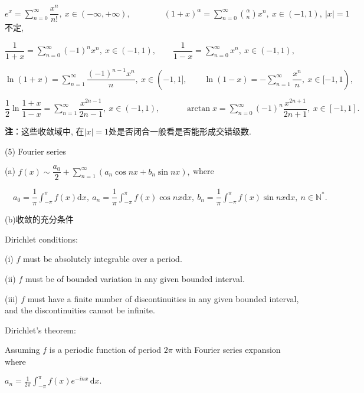 \documentclass[UTF8]{ctexart}
\newcommand\dif{\mathrm{d}}
\newcommand\no{\noindent}
\newcommand\dis{\displaystyle}
\newcommand\sumn{\dis\sum\limits_{n=1}^{\infty}}
\newcommand\sumnz{\dis\sum\limits_{n=0}^{\infty}}
\newcommand\intd{\dis\int}
\begin{document}
\begin{spacing}{2}
\vspace{0.2cm}

$e^x=\sumnz\dfrac{x^n}{n!},\ x\in(-\infty,+\infty),\qquad\qquad(1+x)^\alpha=\sumnz\binom{\alpha}{n}x^n,\ x\in(-1,1),\ |x|=1$不定,

\vspace{0.2cm}

$\dfrac{1}{1+x}=\sumnz(-1)^nx^n,\ x\in(-1,1),\qquad
\dfrac{1}{1-x}=\sumnz x^n,\ x\in(-1,1),$

\vspace{0.2cm}

$\ln(1+x)=\sumn\dfrac{ (-1)^{n-1}x^{n}}{n},\ 
x\in(-1,1],\qquad
\ln(1-x)=-\sumn\dfrac{x^{n}}{n},\ x\in[-1,1),$

\vspace{0.2cm}

$\dfrac{1}{2}\ln\dfrac{1+x}{1-x}=\sumn\dfrac{x^{2n-1}}{2n-1},\ x\in(-1,1),
\qquad\quad
\arctan x=\sumnz(-1)^n\dfrac{x^{2n+1}}{2n+1},\ x\in[-1,1].$

\vspace{0.2cm}

\textbf{注}：这些收敛域中, 在$|x|=1$处是否闭合一般看是否能形成交错级数.

\no(5) Fourier series

(a) $f(x)\sim\dfrac{a_0}{2}+\sumn(a_n\cos nx+b_n\sin nx),\ $where

\vspace{0.2cm}

$\quad a_0=\dfrac{1}{\pi}\intd_{-\pi}^{\pi}f(x)\dif x,\ 
a_n=\dfrac{1}{\pi}\intd_{-\pi}^{\pi}f(x)\cos nx\dif x,\ 
b_n=\dfrac{1}{\pi}\intd_{-\pi}^{\pi}f(x)\sin nx\dif x,\ n\in\mathbb{N}^*.$

(b)收敛的充分条件

\textcolor[rgb]{1,0,0}{Dirichlet conditions:}

 (i)   $f$ must be absolutely integrable over a period.

(ii)  $f$ must be of bounded variation in any given bounded interval.

(iii) $f$ must have a finite number of discontinuities in any given bounded interval, and the discontinuities cannot be infinite.

\textcolor[rgb]{1,0,0}{Dirichlet's theorem:}

Assuming $f$ is a periodic function of period $2\pi$ with Fourier series expansion where

\centerline{\textcolor[rgb]{0,0,1}{${\displaystyle a_{n}={\frac {1}{2\pi }}\int _{-\pi }^{\pi }f(x)e^{-inx}\,\dif x.} $}}


\end{spacing}
\end{document}
